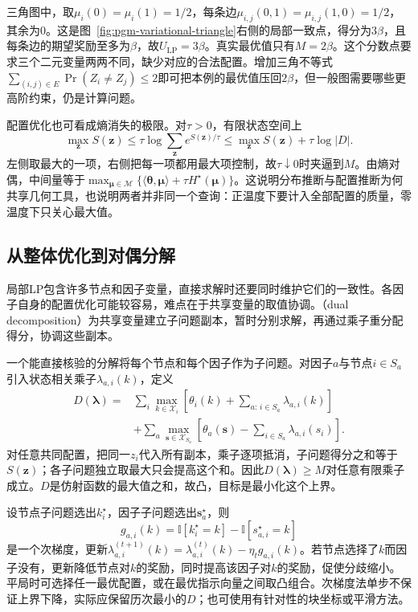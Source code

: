 三角图中，取$\mu_i(0)=\mu_i(1)=1/2$，每条边$\mu_{i,j}(0,1)=\mu_{i,j}(1,0)=1/2$，其余为$0$。这是图~\ref{fig:pgm-variational-triangle}右侧的局部一致点，得分为$3\beta$，且每条边的期望奖励至多为$\beta$，故$U_{\mathrm{LP}}=3\beta$。真实最优值只有$M=2\beta$。这个分数点要求三个二元变量两两不同，缺少对应的合法配置。增加三角不等式$\sum_{(i,j)\in E}\Pr(Z_i\ne Z_j)\leq2$即可把本例的最优值压回$2\beta$，但一般图需要哪些更高阶约束，仍是计算问题。

配置优化也可看成熵消失的极限。对$\tau>0$，有限状态空间上
\[
  \max_{\bm z}S(\bm z)
  \leq \tau\log\sum_{\bm z}e^{S(\bm z)/\tau}
  \leq \max_{\bm z}S(\bm z)+\tau\log|D|.
\]
左侧取最大的一项，右侧把每一项都用最大项控制，故$\tau\downarrow0$时夹逼到$M$。由熵对偶，中间量等于$\max_{\bm{\mu}\in\mathcal M}\{\langle\bm{\theta},\bm{\mu}\rangle+\tau H^\star(\bm{\mu})\}$。这说明分布推断与配置推断为何共享几何工具，也说明两者并非同一个查询：正温度下要计入全部配置的质量，零温度下只关心最大值。

\subsection{从整体优化到对偶分解}
\label{sec:pgm-variational-dual-decomposition}
\label{sec:pgm-variational-dual-trw}

局部LP包含许多节点和因子变量，直接求解时还要同时维护它们的一致性。各因子自身的配置优化可能较容易，难点在于共享变量的取值协调。（dual decomposition）为共享变量建立子问题副本，暂时分别求解，再通过乘子重分配得分，协调这些副本。

一个能直接核验的分解将每个节点和每个因子作为子问题。对因子$a$与节点$i\in S_a$引入状态相关乘子$\lambda_{a,i}(k)$，定义
\begin{equation}
  \begin{aligned}
    D(\bm{\lambda})
       ={}&\sum_i\max_{k\in\mathcal X_i}
          \left[\theta_i(k)+\sum_{a:\,i\in S_a}\lambda_{a,i}(k)\right]\\
        &+\sum_a\max_{\bm s\in\mathcal X_{S_a}}
          \left[\theta_a(\bm s)-\sum_{i\in S_a}\lambda_{a,i}(s_i)\right].
  \end{aligned}
  \label{eq:pgm-variational-dual}
\end{equation}
对任意共同配置，把同一$z_i$代入所有副本，乘子逐项抵消，子问题得分之和等于$S(\bm z)$；各子问题独立取最大只会提高这个和。因此$D(\bm{\lambda})\geq M$对任意有限乘子成立。$D$是仿射函数的最大值之和，故凸，目标是最小化这个上界。

设节点子问题选出$k_i^\star$，因子子问题选出$\bm s_a^\star$，则
\[
  g_{a,i}(k)=\mathbb I[k_i^\star=k]-\mathbb I[s_{a,i}^\star=k]
\]
是一个次梯度，更新$\lambda_{a,i}^{(t+1)}(k)=\lambda_{a,i}^{(t)}(k)-\eta_t g_{a,i}(k)$。若节点选择了$k$而因子没有，更新降低节点对$k$的奖励，同时提高该因子对$k$的奖励，促使分歧缩小。平局时可选择任一最优配置，或在最优指示向量之间取凸组合。次梯度法单步不保证上界下降，实际应保留历次最小的$D$；也可使用有针对性的块坐标或平滑方法。


